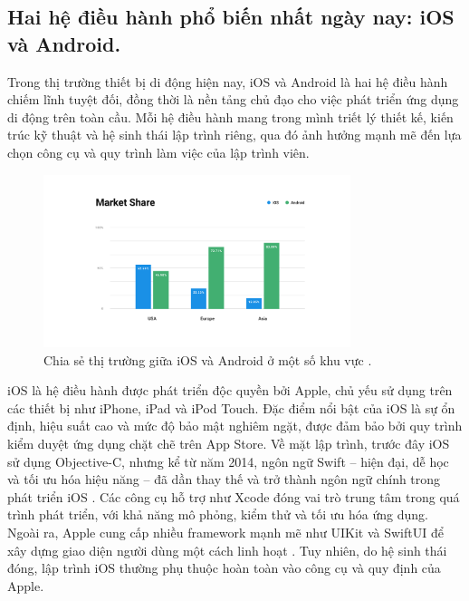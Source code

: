 \subsection{Hai hệ điều hành phổ biến nhất ngày nay: iOS và Android.}
\renewcommand{\labelitemi}{--}   
\begin{flushleft}
  \hspace*{0.8cm}Trong thị trường thiết bị di động hiện nay, iOS và Android là hai hệ điều hành chiếm lĩnh tuyệt đối, đồng thời là nền tảng chủ đạo cho việc phát triển ứng dụng di động trên toàn cầu. Mỗi hệ điều hành mang trong mình triết lý thiết kế, kiến trúc kỹ thuật và hệ sinh thái lập trình riêng, qua đó ảnh hưởng mạnh mẽ đến lựa chọn công cụ và quy trình làm việc của lập trình viên.
\end{flushleft}

\begin{figure}[H]
  \centering
  \includegraphics[width=0.8\textwidth]{images/Market Share.png}
  \caption{Chia sẻ thị trường giữa iOS và Android ở một số khu vực \cite{egoMarketShare}.}
  \label{fig:fig}
\end{figure}
    \begin{flushleft}
        \hspace*{0.8cm}iOS là hệ điều hành được phát triển độc quyền bởi Apple, chủ yếu sử dụng trên các thiết bị như iPhone, iPad và iPod Touch. Đặc điểm nổi bật của iOS là sự ổn định, hiệu suất cao và mức độ bảo mật nghiêm ngặt, được đảm bảo bởi quy trình kiểm duyệt ứng dụng chặt chẽ trên App Store. Về mặt lập trình, trước đây iOS sử dụng Objective-C, nhưng kể từ năm 2014, ngôn ngữ Swift – hiện đại, dễ học và tối ưu hóa hiệu năng – đã dần thay thế và trở thành ngôn ngữ chính trong phát triển iOS \cite{swift}. Các công cụ hỗ trợ như Xcode đóng vai trò trung tâm trong quá trình phát triển, với khả năng mô phỏng, kiểm thử và tối ưu hóa ứng dụng. Ngoài ra, Apple cung cấp nhiều framework mạnh mẽ như UIKit và SwiftUI để xây dựng giao diện người dùng một cách linh hoạt \cite{swiftui}. Tuy nhiên, do hệ sinh thái đóng, lập trình iOS thường phụ thuộc hoàn toàn vào công cụ và quy định của Apple.
    \end{flushleft}

